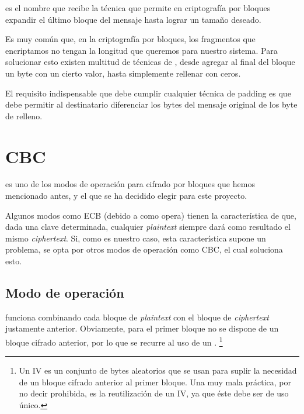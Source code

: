   es el nombre que recibe la técnica que permite en criptografía por bloques expandir el último bloque del mensaje hasta lograr un tamaño deseado.

 Es muy común que, en la criptografía por bloques, los fragmentos que encriptamos no tengan la longitud que queremos para nuestro sistema.
 Para solucionar esto existen multitud de técnicas de , desde agregar al final del bloque un byte con un cierto valor, hasta simplemente rellenar con ceros.

 El requisito indispensable que debe cumplir cualquier técnica de padding es que debe permitir al destinatario diferenciar los bytes del mensaje original de los byte de relleno. \emph{\parencite{Reference8}}


 \section{CBC}

  es uno de los modos de operación para cifrado por bloques que hemos mencionado antes,
 y el que se ha decidido elegir para este proyecto.

 Algunos modos como ECB (debido a como opera) tienen la característica de que, dada una clave determinada,
 cualquier \emph{plaintext} siempre dará como resultado el mismo \emph{ciphertext}.
 Si, como es nuestro caso, esta característica supone un problema,
 se opta por otros modos de operación como CBC, el cual soluciona esto. \emph{\parencite{Reference23}}

 \subsection{Modo de operación}

  funciona combinando cada bloque de \emph{plaintext} con el bloque de \emph{ciphertext} justamente anterior.
 Obviamente, para el primer bloque no se dispone de un bloque cifrado anterior,
 por lo que se recurre al uso de un .
 \footnote{Un IV es un conjunto de bytes aleatorios que se usan para suplir la necesidad de un bloque cifrado anterior al primer bloque.
 Una muy mala práctica, por no decir prohibida, es la reutilización de un IV, ya que éste debe ser de uso único.}

